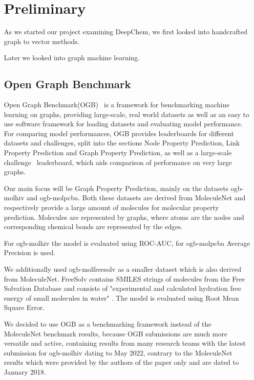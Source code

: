\section{Preliminary}

As we started our project examining DeepChem, we first looked into handcrafted graph to vector methods.

Later we looked into graph machine learning.

\subsection{Open Graph Benchmark}
Open Graph Benchmark(OGB)~\cite{2021ogb} is a framework for benchmarking machine learning on graphs, providing large-scale, real world datasets as well as an easy to use software framework for loading  datasets and evaluating model performance.
For comparing model performances, OGB provides leaderboards for different datasets and challenges, split into the sections Node Property Prediction, Link Property Prediction and Graph Property Prediction, as well as a large-scale challenge~\cite{hu2021ogblsc} leaderboard, which aids comparison of performance on very large graphs.

Our main focus will be Graph Property Prediction, mainly on the datasets ogb-molhiv and ogb-molpcba. Both these datasets are derived from MoleculeNet and respectively provide a large amount of molecules for molecular property prediction. Molecules are represented by graphs, where atoms are the nodes and corresponding chemical bonds are represented by the edges. 

For ogb-molhiv the model is evaluated using ROC-AUC, for ogb-molpcba Average Precision is used.

We additionally used ogb-molfreesolv as a smaller dataset which is also derived from MoleculeNet. FreeSolv contains SMILES strings of molecules from the Free Solvation Database and consists of "experimental and calculated hydration free energy of small molecules in water" . The model is evaluated using Root Mean Square Error.

We decided to use OGB as a benchmarking framework instead of the MoleculeNet benchmark results, because OGB submissions are much more versatile and active, containing results from many research teams with the latest submission for ogb-molhiv dating to May 2022, contrary to the MoleculeNet results which were provided by the authors of the paper only and are dated to January 2018. 


